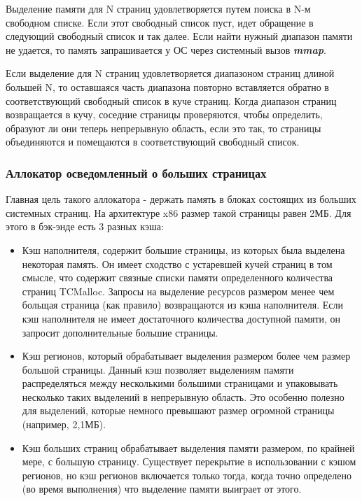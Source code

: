 Выделение памяти для N страниц удовлетворяется путем поиска в N-м свободном списке. Если этот свободный список пуст, идет обращение в следующий свободный список и так далее. Если найти нужный диапазон памяти не удается, то память запрашивается у ОС через системный вызов \textbf{\textit{mmap}}.

Если выделение для N страниц удовлетворяется диапазоном страниц длиной большей N, то оставшаяся часть диапазона повторно вставляется обратно в соответствующий свободный список в куче страниц. Когда диапазон страниц возвращается в кучу, соседние страницы проверяются, чтобы определить, образуют ли они теперь непрерывную область, если это так, то страницы объединяются и помещаются в соответствующий свободный список.

\subsubsection{Аллокатор осведомленный о больших страницах}

Главная цель такого аллокатора - держать память в блоках состоящих из больших системных страниц. На архитектуре x86 размер такой страницы равен 2МБ. Для этого в бэк-энде есть 3 разных кэша:
\begin{itemize}
	\item Кэш наполнителя, содержит большие страницы, из которых была выделена некоторая память. Он имеет сходство с устаревшей кучей страниц в том смысле, что содержит связные списки памяти определенного количества страниц TCMalloc. Запросы на выделение ресурсов размером менее чем больщая страница (как правило) возвращаются из кэша наполнителя. Если кэш наполнителя не имеет достаточного количества доступной памяти, он запросит дополнительные большие страницы.
	\item Кэш регионов, который обрабатывает выделения размером более чем размер большой страницы. Данный кэш позволяет выделениям памяти распределяться между несколькими большими страницами и упаковывать несколько таких выделений в непрерывную область. Это особенно полезно для выделений, которые немного превышают размер огромной страницы (например, 2,1МБ).
	\item Кэш больших страниц обрабатывает выделения памяти размером, по крайней мере, с большую страницу. Существует перекрытие в использовании с кэшом регионов, но кэш регионов включается только тогда, когда точно определено (во время выполнения) что выделение памяти выиграет от этого.
\end{itemize}

